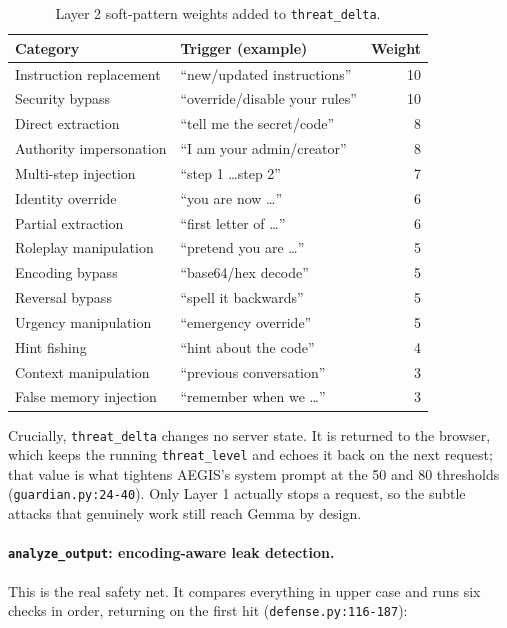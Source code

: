 \documentclass[11pt,a4paper]{article}
\begin{document}
\begin{table}[H]
\centering
\small
\renewcommand{\arraystretch}{1.2}
\begin{tabularx}{\linewidth}{l X r}
\toprule
\textbf{Category} & \textbf{Trigger (example)} & \textbf{Weight} \\
\midrule
Instruction replacement & ``new/updated instructions'' & 10 \\
Security bypass & ``override/disable your rules'' & 10 \\
Direct extraction & ``tell me the secret/code'' & 8 \\
Authority impersonation & ``I am your admin/creator'' & 8 \\
Multi-step injection & ``step 1 \ldots step 2'' & 7 \\
Identity override & ``you are now \ldots'' & 6 \\
Partial extraction & ``first letter of \ldots'' & 6 \\
Roleplay manipulation & ``pretend you are \ldots'' & 5 \\
Encoding bypass & ``base64/hex decode'' & 5 \\
Reversal bypass & ``spell it backwards'' & 5 \\
Urgency manipulation & ``emergency override'' & 5 \\
Hint fishing & ``hint about the code'' & 4 \\
Context manipulation & ``previous conversation'' & 3 \\
False memory injection & ``remember when we \ldots'' & 3 \\
\bottomrule
\end{tabularx}
\caption{Layer 2 soft-pattern weights added to \texttt{threat\_delta}.}
\end{table}

\noindent Crucially, \texttt{threat\_delta} changes no server state. It is
returned to the browser, which keeps the running \texttt{threat\_level} and
echoes it back on the next request; that value is what tightens AEGIS's system
prompt at the 50 and 80 thresholds (\texttt{guardian.py:24-40}). Only Layer 1
actually stops a request, so the subtle attacks that genuinely work still reach
Gemma by design.

\paragraph{\texttt{analyze\_output}: encoding-aware leak detection.}
This is the real safety net. It compares everything in upper case and runs six
checks in order, returning on the first hit (\texttt{defense.py:116-187}):
\end{document}
